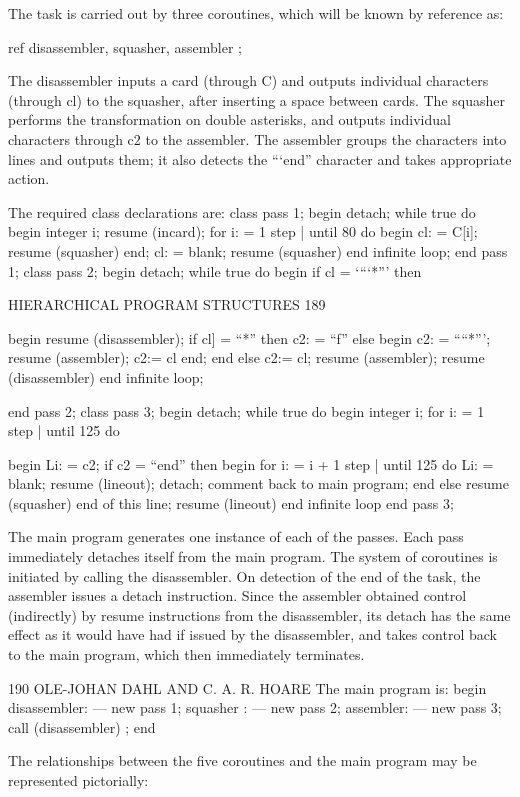 The task is carried out by three coroutines, which will be known by reference as:

ref disassembler, squasher, assembler ;

The disassembler inputs a card (through C) and outputs individual characters (through cl) to the squasher, after inserting a space between cards. The squasher performs the transformation on double asterisks, and outputs individual characters through c2 to the assembler. The assembler groups the characters into lines and outputs them; it also detects the “‘end” character and takes appropriate action.

The required class declarations are: class pass 1; begin detach; while true do begin integer i; resume (incard); for i: = 1 step | until 80 do begin cl: = C[i]; resume (squasher) end; cl: = blank; resume (squasher) end infinite loop; end pass 1; class pass 2; begin detach; while true do begin if cl = ‘“‘*”’ then

HIERARCHICAL PROGRAM STRUCTURES 189

begin resume (disassembler); if cl] = “*” then c2: = “f” else begin c2: = ““*”’; resume (assembler); c2:= cl end; end else c2:= cl; resume (assembler); resume (disassembler) end infinite loop;

end pass 2; class pass 3; begin detach; while true do begin integer i; for i: = 1 step | until 125 do

begin L{i}: = c2; if c2 = “end” then begin for i: = i + 1 step | until 125 do L{i}: = blank; resume (lineout); detach; comment back to main program; end else resume (squasher) end of this line; resume (lineout) end infinite loop end pass 3;

The main program generates one instance of each of the passes. Each pass immediately detaches itself from the main program. The system of coroutines is initiated by calling the disassembler. On detection of the end of the task, the assembler issues a detach instruction. Since the assembler obtained control (indirectly) by resume instructions from the disassembler, its detach has the same effect as it would have had if issued by the disassembler, and takes control back to the main program, which then immediately terminates.

190 OLE-JOHAN DAHL AND C. A. R. HOARE The main program is: begin disassembler: — new pass 1; squasher : — new pass 2; assembler: — new pass 3; call (disassembler) ; end

The relationships between the five coroutines and the main program may be represented pictorially:


